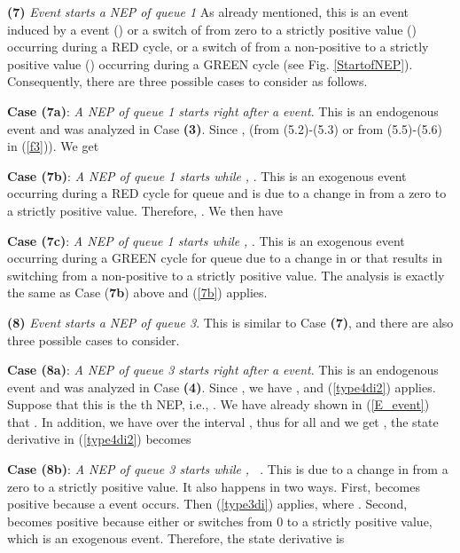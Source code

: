 \documentclass{ifacconf}\usepackage{graphicx}
\begin{document}
\textbf{(7)} \emph{Event }\emph{ starts a NEP of queue 1} As already
mentioned, this is an event induced by a  event () or a switch
of  from zero to a strictly positive value () occurring
during a RED cycle, or a switch of  from a
non-positive to a strictly positive value () occurring during a GREEN
cycle (see Fig. \ref{StartofNEP}). Consequently, there are three possible
cases to consider as follows.

\textbf{Case (7a)}: \emph{A NEP of queue 1 starts right after a }\emph{ event}. This is an endogenous event and was analyzed in Case
\textbf{(3)}. Since ,  (from (5.2)-(5.3) or from
(5.5)-(5.6) in (\ref{f3})). We get



\textbf{Case (7b)}: \emph{ A NEP of queue 1 starts while }\emph{,  }. This is an exogenous event occurring during
a RED cycle for queue  and is due to a change in 
from a zero to a strictly positive value. Therefore, .
We then have



\textbf{Case (7c)}: \emph{A NEP of queue 1 starts while }\emph{,  }. This is an exogenous event occurring during
a GREEN cycle for queue  due to a change in  or
 that results in  switching from a non-positive to a strictly positive value. The
analysis is exactly the same as Case (\textbf{7b}) above and (\ref{7b}) applies.

\textbf{(8)} \emph{Event }\emph{ starts a NEP of queue 3}. This is
similar to Case \textbf{(7)}, and there are also three possible cases to consider.

\textbf{Case (8a)}: \emph{A NEP of queue 3 starts right after a }\emph{ event}. This is an endogenous event and was analyzed in Case
\textbf{(4)}. Since , we have , and (\ref{type4di2})
applies. Suppose that this is the th NEP, i.e., . We
have already shown in (\ref{E_event}) that . In addition, we have  over the interval , thus  for all  and we get  , the state derivative in
(\ref{type4di2}) becomes



\textbf{Case (8b)}: \emph{ A NEP of queue 3 starts while }\emph{, \ }. This is due to a change in  from a zero to a strictly positive value. It also happens in
two ways. First,  becomes positive
because a  event occurs. Then (\ref{type3di}) applies, where
. Second,  becomes
positive because either  or  switches
from 0 to a strictly positive value, which is an exogenous event. Therefore,
the state derivative is
\end{document}
